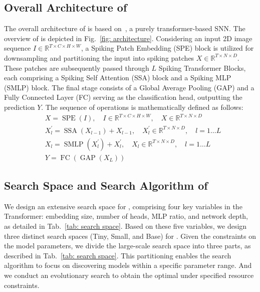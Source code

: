 \documentclass{article}
\theoremstyle{plain}
\theoremstyle{definition}
\theoremstyle{remark}
\begin{document}
\subsection{Overall Architecture of \sysname} \label{Overall Architecture}
The overall architecture of \sysname is based on~\cite{zhouSpikformerWhenSpiking2022}, a purely transformer-based SNN. The overview of \sysname is depicted in Fig.~\ref{fig: architecture}. Considering an input 2D image sequence $I \in \mathbb{R}^{T \times C \times H \times W}$, a Spiking Patch Embedding (SPE) block is utilized for downsampling and partitioning the input into spiking patches $X \in \mathbb{R}^{T \times N \times D}$. These patches are subsequently passed through $L$ Spiking Transformer Blocks, each comprising a Spiking Self Attention (SSA) block and a Spiking MLP (SMLP) block. The final stage consists of a Global Average Pooling (GAP) and a Fully Connected Layer (FC) serving as the classification head, outputting the prediction $Y$. The sequence of operations is mathematically defined as follows:
\begin{align}
&X=\operatorname{SPE}(I), \quad I \in \mathbb{R}^{T \times C \times H \times W}, \quad  X \in \mathbb{R}^{T \times N \times D} \\
&X_l^{\prime}=\operatorname{SSA}\left(X_{l-1}\right)+X_{l-1}, \quad X_l^{\prime} \in \mathbb{R}^{T \times N \times D}, \quad l=1 \ldots L \\
&X_l=\operatorname{SMLP}\left(X_l^{\prime}\right)+X_l^{\prime}, \quad X_l \in \mathbb{R}^{T \times N \times D}, \quad l=1 \ldots L \\
&Y=\operatorname{FC}\left(\operatorname{GAP}\left(X_L\right)\right)
\end{align}
\subsection{Search Space and Search Algorithm of \sysname} \label{search space}

We design an extensive search space for \sysname, comprising four key variables in the Transformer: embedding size, number of heads, MLP ratio, and network depth, as detailed in Tab.~\ref{tab: search space}. Based on these five variables, we design three distinct search spaces (Tiny, Small, and Base) for \sysname. Given the constraints on the model parameters, we divide the large-scale search space into three parts, as described in Tab.~\ref{tab: search space}. This partitioning enables the search algorithm to focus on discovering models within a specific parameter range. And we conduct an evolutionary search to obtain the optimal \sysname under specified resource constraints.
\end{document}
